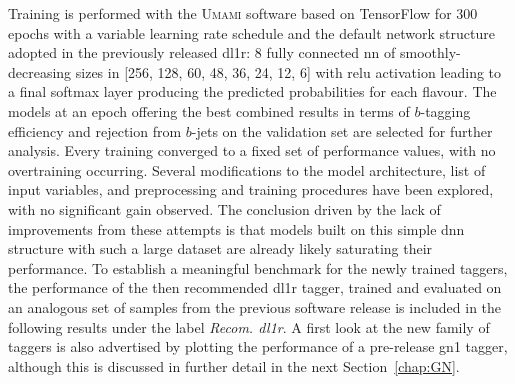 
Training is performed with the \textsc{Umami} software \cite{UmamiCite} based on TensorFlow \cite{tensorflow2015-whitepaper} for 300 epochs with a variable learning rate schedule and the default network structure adopted in the previously released \gls{dl1r}: 8 fully connected \gls{nn} of smoothly-decreasing sizes in [256, 128, 60, 48, 36, 24, 12, 6] with \gls{relu} activation leading to a final softmax layer producing the predicted probabilities for each flavour. The models at an epoch offering the best combined results in terms of $b$-tagging efficiency and rejection from $b$-jets on the validation set are selected for further analysis. Every training converged to a fixed set of performance values, with no overtraining occurring. Several modifications to the model architecture, list of input variables, and preprocessing and training procedures have been explored, with no significant gain observed. 
The conclusion driven by the lack of improvements from these attempts is that models built on this simple \gls{dnn} structure with such a large dataset are already likely saturating their performance. To establish a meaningful benchmark for the newly trained taggers, the performance of the then recommended \gls{dl1r} tagger, trained and evaluated on an analogous set of samples from the previous software release is included in the following results under the label \textit{Recom. \gls{dl1r}}. A first look at the new family of taggers is also advertised by plotting the performance of a pre-release \gls{gn1} tagger, although this is discussed in further detail in the next Section~\ref{chap:GN}. 

